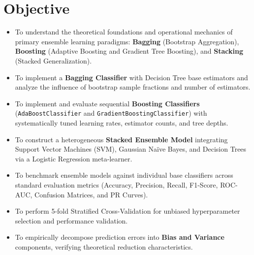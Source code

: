 \documentclass[12pt,a4paper]{article}
\begin{document}
\section{Objective}
\begin{itemize}[leftmargin=*]
    \item To understand the theoretical foundations and operational mechanics of primary ensemble learning paradigms: \textbf{Bagging} (Bootstrap Aggregation), \textbf{Boosting} (Adaptive Boosting and Gradient Tree Boosting), and \textbf{Stacking} (Stacked Generalization).
    \item To implement a \textbf{Bagging Classifier} with Decision Tree base estimators and analyze the influence of bootstrap sample fractions and number of estimators.
    \item To implement and evaluate sequential \textbf{Boosting Classifiers} (\texttt{AdaBoostClassifier} and \texttt{GradientBoostingClassifier}) with systematically tuned learning rates, estimator counts, and tree depths.
    \item To construct a heterogeneous \textbf{Stacked Ensemble Model} integrating Support Vector Machines (SVM), Gaussian Na\"ive Bayes, and Decision Trees via a Logistic Regression meta-learner.
    \item To benchmark ensemble models against individual base classifiers across standard evaluation metrics (Accuracy, Precision, Recall, F1-Score, ROC-AUC, Confusion Matrices, and PR Curves).
    \item To perform 5-fold Stratified Cross-Validation for unbiased hyperparameter selection and performance validation.
    \item To empirically decompose prediction errors into \textbf{Bias and Variance} components, verifying theoretical reduction characteristics.
\end{itemize}
\end{document}
